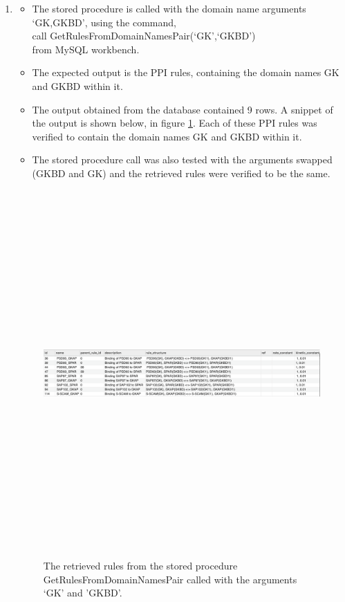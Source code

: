 \documentclass[msc,deptreport,ai]{infthesis}      %
\begin{document}
\begin{enumerate}
	\item 
\begin{itemize}
	\item 	The stored procedure is called with the domain name arguments `GK,GKBD', using the command, \\
	call GetRulesFromDomainNamesPair(`GK',`GKBD')\\
	from MySQL workbench. 
	\item The expected output is the PPI rules, containing the domain names GK and GKBD within it.
	\item The output obtained from the database contained 9 rows. A snippet of the output is shown below, in figure \ref{fig:DomainNameOutput2}. Each of these PPI rules was verified to contain the domain names GK and GKBD within it.
	\item The stored procedure call was also tested with the arguments swapped (GKBD and GK) and the retrieved rules were verified to be the same.		
\end{itemize}
\begin{figure}[H]
	\centering
	\captionsetup{justification=centering}
	\includegraphics[width=\linewidth,height=14cm,keepaspectratio]{DomainNameOutput2.png}	
	\caption{The retrieved rules from the stored procedure GetRulesFromDomainNamesPair called with the arguments `GK' and 'GKBD'.}
	\label{fig:DomainNameOutput2}		
\end{figure}
\end{enumerate}
\end{document}
